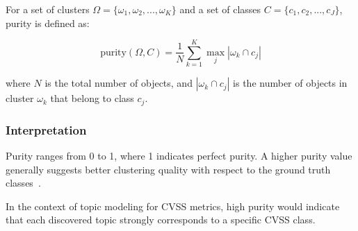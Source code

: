 \documentclass[12pt]{article}
\begin{document}
For a set of clusters $\Omega = \{\omega_1, \omega_2, ..., \omega_K\}$ and a set of classes $C =
	\{c_1, c_2, ..., c_J\}$, purity is defined as:

\begin{equation}
	\text{purity}(\Omega, C) = \frac{1}{N} \sum_{k=1}^K \max_j |\omega_k \cap c_j|
\end{equation}

where $N$ is the total number of objects, and $|\omega_k \cap c_j|$ is the number of objects in
cluster $\omega_k$ that belong to class $c_j$.

\subsubsection{Interpretation}

Purity ranges from 0 to 1, where 1 indicates perfect purity. A higher purity value generally
suggests better clustering quality with respect to the ground truth classes~\cite{purity_info_ret}.

In the context of topic modeling for CVSS metrics, high purity would indicate that each discovered
topic strongly corresponds to a specific CVSS class.
\end{document}
